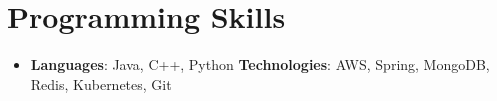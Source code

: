 \documentclass[letterpaper,11pt]{article}
\newcommand{\resumeItem}[1]{
    \item\small{
        {#1 \vspace{-2pt}}
    }
}
\newcommand{\resumeSubHeadingListStart}{\begin{itemize}[leftmargin=*]}
\newcommand{\resumeSubHeadingListEnd}{\end{itemize}}
\newcommand{\resumeItemListStart}{\begin{itemize}}
\begin{document}




\section{Programming Skills}
 \resumeSubHeadingListStart
   \item{
     \textbf{Languages}{: Java, C++, Python}
     \hfill
     \textbf{Technologies}{: AWS, Spring, MongoDB, Redis, Kubernetes, Git}
   }
 \resumeSubHeadingListEnd


\end{document}
